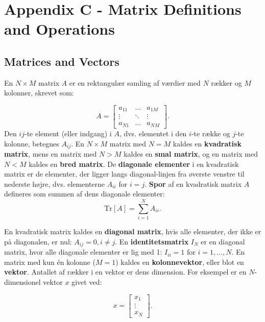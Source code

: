 \documentclass[a4paper,12pt]{book}
\begin{document}
	\chapter{Appendix C - Matrix Definitions and Operations}
	
	\section{Matrices and Vectors}
	En \(N \times M\) matrix \(A\) er en rektangulær samling af værdier med \(N\) rækker og \(M\) kolonner, skrevet som:
	
	\[
	A = \begin{bmatrix} 
		a_{11} & \dots & a_{1M} \\
		\vdots & \ddots & \vdots \\
		a_{N1} & \dots & a_{NM} 
	\end{bmatrix}.
	\]
	Den \(ij\)-te element (eller indgang) i \(A\), dvs. elementet i den \(i\)-te række og \(j\)-te kolonne, betegnes \(A_{ij}\). En \(N \times M\) matrix med \(N = M\) kaldes en \textbf{kvadratisk matrix}, mens en matrix med \(N > M\) kaldes en \textbf{smal matrix}, og en matrix med \(N < M\) kaldes en \textbf{bred matrix}.
	\newline\newline
	De \textbf{diagonale elementer} i en kvadratisk matrix er de elementer, der ligger langs diagonal-linjen fra øverste venstre til nederste højre, dvs. elementerne \(A_{ii}\) for \(i = j\). \textbf{Spor} af en kvadratisk matrix \(A\) defineres som summen af dens diagonale elementer: 
	\[
	\text{Tr}[A] = \sum_{i=1}^{N} A_{ii}.
	\]
	
	En kvadratisk matrix kaldes en \textbf{diagonal matrix}, hvis alle elementer, der ikke er på diagonalen, er nul: \(A_{ij} = 0, i \neq j\).
	\newline\newline
	En \textbf{identitetsmatrix} \(I_N\) er en diagonal matrix, hvor alle diagonale elementer er lig med 1: \(I_{ii} = 1\) for \(i = 1, \dots, N\). 
	\newline\newline
	En matrix med kun én kolonne (\(M = 1\)) kaldes en \textbf{kolonnevektor}, eller blot en \textbf{vektor}. Antallet af rækker i en vektor er dens dimension. For eksempel er en \(N\)-dimensionel vektor \(x\) givet ved:
	
	\[
	x = \begin{bmatrix} 
		x_1 \\
		\vdots \\
		x_N 
	\end{bmatrix}.
	\]
	
\end{document}
